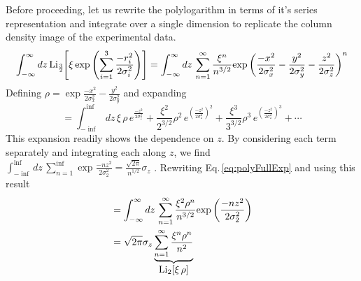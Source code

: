 Before proceeding, let us rewrite the polylogarithm in terms of it's series representation and integrate over a single dimension to replicate the column density image of the experimental data.
\begin{equation}
	\int_{-\infty}^{\infty} dz\,\text{Li}_{\scriptscriptstyle\frac{3}{2}\!}\!\left[ \xi \,\text{exp}\left( {\sum_{i=1}^3 \frac{-r_i^2}{2\sigma_i^2}} \right) \right] = 
	\int_{-\infty}^{\infty} dz\, \sum_{n=1}^{\infty} \frac{\xi^n}{n^{3/2}}\text{exp}\left( {\frac{-x^2}{2\sigma_x^2} - \frac{y^2}{2\sigma_y^2} - \frac{z^2}{2\sigma_z^2}} \right)^n
\end{equation}
Defining $\rho=\exp{\frac{-x^2}{2\sigma_x^2} - \frac{y^2}{2\sigma_y^2}}$ and expanding
\begin{equation} \label{eq:polyFullExp}
	=\int_{-\inf}^{\inf} dz\, \xi\,\rho\,e^{\frac{-z^2}{2\sigma_z^2}} + 
 \frac{\xi^2}{2^{3/2}}\rho^2\,e^{\left(\frac{-z^2}{2\sigma_z^2}\right)^2} + 
 \frac{\xi^3}{3^{3/2}}\rho^3\,e^{\left(\frac{-z^2}{2\sigma_z^2}\right)^3} + \cdots
\end{equation}
This expansion readily shows the dependence on $z$. 
By considering each term separately and integrating each along $z$, we find $\displaystyle\int_{-\inf}^{\inf} dz\, \sum_{n=1}^{\inf}\exp{\frac{-n z^2}{2\sigma_2^2}} = \frac{\sqrt{2\pi}}{n^{1/2}}\sigma_z$ \cite{Ketterle1999, Gotlibovych2014}.
Rewriting Eq.\,\ref{eq:polyFullExp} and using this result
\begingroup
\addtolength{\jot}{1em}
\begin{equation}
\begin{split}
	&=\int_{-\infty}^{\infty} dz\, \sum_{n=1}^{\infty}\frac{\xi^2\rho^n}{n^{3/2}}\text{exp}\left( {\frac{-n z^2}{2\sigma_2^2}} \right) \\
	&=\sqrt{2\pi}\sigma_z\underbrace{\sum_{n=1}^{\infty}\frac{\xi^n\rho^n}{n^2}}_{\displaystyle\text{Li}_{2}\!\left[ \xi\,\rho \right]}
\end{split}
\end{equation}
\endgroup

